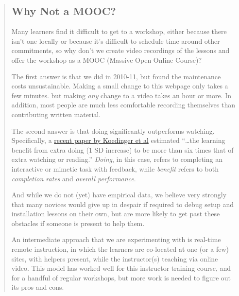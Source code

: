 \begin{quotation}   %
\subsection*{Why Not a MOOC?}

Many learners find it difficult to get to a workshop,
either because there isn't one locally
or because it's difficult to schedule time around other commitments,
so why don't we create video recordings of the lessons
and offer the workshop as a MOOC (Massive Open Online Course)?

The first answer is that we did in 2010-11,
but found the maintenance costs unsustainable.
Making a small change to this webpage only takes a few minutes.
but making \emph{any} change to a video takes an hour or more.
In addition,
most people are much less comfortable recording themselves
than contributing written material.

The second answer is that doing significantly outperforms watching.
Specifically, a \href{\{\{ site.github.url \}\}/files/papers/koedinger-doing-watching-2015.pdf}{recent paper by Koedinger et al} estimated
``\ldots{}the learning benefit from extra doing (1 SD increase) to be more than six times that of extra watching or reading.'' \emph{Doing}, in this case,
refers to completing an interactive or mimetic task with feedback,
while \emph{benefit} refers to both \emph{completion rates} and \emph{overall performance}.

And while we do not (yet) have empirical data,
we believe very strongly that many novices would give up in despair
if required to debug setup and installation lessons on their own,
but are more likely to get past these obstacles if someone is present to help them.

An intermediate approach that we are experimenting with is real-time remote instruction,
in which the learners are co-located at one (or a few) sites,
with helpers present,
while the instructor(s) teaching via online video.
This model has worked well for this instructor training course,
and for a handful of regular workshops,
but more work is needed to figure out its pros and cons.
\end{quotation}   %

